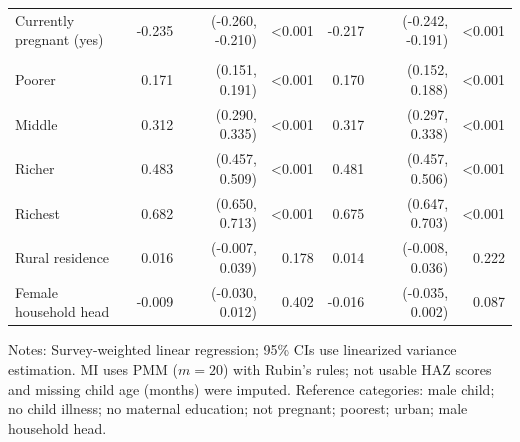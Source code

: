 \begin{table}[htbp]
\begin{threeparttable}
\begin{tabularx}{\textwidth}{
>{\raggedright\arraybackslash}X
r r r
r r r}
\addlinespace[4pt]
Currently pregnant (yes) 
& -0.235 & (-0.260, -0.210) & \textless0.001 
& -0.217 & (-0.242, -0.191) & \textless0.001 \\

\addlinespace[4pt]
\multicolumn{7}{l}{\textbf{Wealth index (ref: poorest)}} \\

Poorer 
& 0.171 & (0.151, 0.191) & \textless0.001 
& 0.170 & (0.152, 0.188) & \textless0.001 \\

Middle 
& 0.312 & (0.290, 0.335) & \textless0.001 
& 0.317 & (0.297, 0.338) & \textless0.001 \\

Richer 
& 0.483 & (0.457, 0.509) & \textless0.001 
& 0.481 & (0.457, 0.506) & \textless0.001 \\

Richest 
& 0.682 & (0.650, 0.713) & \textless0.001 
& 0.675 & (0.647, 0.703) & \textless0.001 \\

\addlinespace[4pt]
Rural residence 
& 0.016 & (-0.007, 0.039) & 0.178 
& 0.014 & (-0.008, 0.036) & 0.222 \\

Female household head 
& -0.009 & (-0.030, 0.012) & 0.402 
& -0.016 & (-0.035, 0.002) & 0.087 \\

\bottomrule
\end{tabularx}

\begin{tablenotes}[flushleft]
\footnotesize
\item Notes: Survey-weighted linear regression; 95\% CIs use linearized variance estimation. MI uses PMM ($m=20$) with Rubin’s
rules; not usable HAZ scores and missing child age (months) were imputed. Reference categories: male child;
no child illness; no maternal education; not pregnant; poorest; urban; male household head.
\end{tablenotes}

\end{threeparttable}
\end{table}